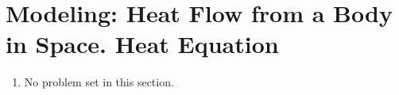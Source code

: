 \section{Modeling: Heat Flow from a Body in Space. Heat Equation}

\begin{enumerate}
    \item No problem set in this section.
\end{enumerate}